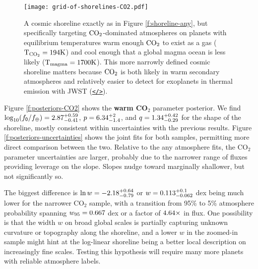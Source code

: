 \documentclass[modern,linenumbers,trackchanges]{aastex7}
\begin{document}
\begin{figure*}[ht!]
\texttt{[image: grid-of-shorelines-CO2.pdf]}
\caption{A cosmic shoreline exactly as in Figure \ref{f:shoreline-any}, but specifically targeting $\rm{CO}_2$-dominated atmospheres on planets with equilibrium temperatures warm enough $\rm{CO_2}$ to exist as a gas (${\rm T_{CO_2}}= 194 \mathrm{K}$) and cool enough that a global magma ocean is less likely (${\rm T_{magma}} = 1700 \mathrm{K}$). This more narrowly defined cosmic shoreline matters because $\rm CO_2$ is both likely in warm secondary atmospheres and relatively easier to detect for exoplanets in thermal emission with JWST (\href{https://github.com/zkbt/shoreline/blob/main/notebooks/plot-shorelines.ipynb}{\texttt{</>}}).}
\label{f:shoreline-CO2}
\end{figure*}

Figure \ref{f:posteriors-CO2} shows the {\bf warm CO$_2$} parameter posterior. We find $\log_{10} (f_{\sf 0}/f_\oplus) = 2.87_{-0.41}^{+0.59}$, $p = 6.34_{-1.4}^{+2}$, and $q = 1.34_{-0.29}^{+0.42}$ for the shape of the shoreline, mostly consistent within uncertainties with the previous results. Figure \ref{f:posteriors-uncertainties} shows the joint fits for both samples, permitting more direct comparison between the two. Relative to the any atmosphere fits, the CO$_2$ parameter uncertainties are larger, probably due to the narrower range of fluxes providing leverage on the slope. Slopes nudge toward marginally shallower, but not significantly so. 

The biggest difference is $\ln w = -2.18_{-0.79}^{+0.64}$ or $w = 0.113_{-0.062}^{+0.1}$ dex being much lower for the narrower CO$_2$ sample, with a transition from 95\% to 5\% atmosphere probability spanning $w_{95} = 0.667$ dex or a factor of $4.64\times$ in flux. One possibility is that the width $w$ on broad global scales is partially capturing unknown curvature or topography along the shoreline, and a lower $w$ in the zoomed-in sample might hint at the log-linear shoreline being a better local description on increasingly fine scales. Testing this hypothesis will require many more planets with reliable atmosphere labels. 
\end{document}
